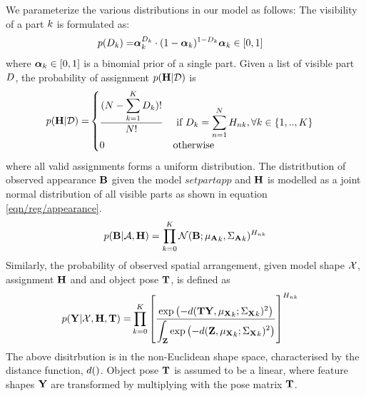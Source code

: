 We parameterize the various distributions in our model as follows:
The visibility of a part $k$ is formulated as:
\begin{align}
	p({D}_{k}) = & \bm{\alpha}_k^{{D}_{k}}\cdot(1-\bm{\alpha}_k)^{1-{D}_{k}} \bm{\alpha}_k\in[0, 1] 
	\label{eqn/reg/Ddist}
\end{align}
where $\bm{\alpha}_k\in [0, 1]$ is a binomial prior of a single part. Given a list of visible part ${D}$, the probability of assignment $p(\mathbf{H}|\mathcal{D})$ is 
\begin{align}
	p(\mathbf{H}|\mathcal{D}) = & 
	\begin{cases} 
	\displaystyle\frac{(N - \displaystyle\sum_{k=1}^{K}{D}_k)!}{N!} & \mbox{ if } {D}_k = \displaystyle\sum_{n=1}^{N}{H}_{nk},   \forall k\in\{1,..,K\} \\ 
	0 & \mbox{otherwise} 
	\end{cases}
	\label{eqn/reg/HDdist}
\end{align}
where all valid assignments forms a uniform distribution. The distritbution of observed appearance $\mathbf{B}$ given the model $setpartapp$ and $\mathbf{H}$ is modelled as a joint normal distribution of all visible parts as shown in equation \ref{eqn/reg/appearance}. 
\begin{equation}
	p(\mathbf{B}|\mathcal{A},\mathbf{H}) =\displaystyle\prod_{k=0}^K
	\mathcal{N}(\mathbf{B}; {\mu_{\mathbf{A}}}_k, {\Sigma_{\mathbf{A}}}_k)^{{H}_{nk}}
	\label{eqn/reg/appearance}
\end{equation}
Similarly, the probability of observed spatial arrangement, given model shape $\mathcal{X}$, assignment $\mathbf{H}$ and and object pose $\mathbf{T}$, is defined as 
\begin{align}
	\displaystyle p(\mathbf{Y}|\mathcal{X},\mathbf{H},\mathbf{T}) = & \prod_{k=0}^K
	\left[\frac{\textstyle\exp\left(-d(\mathbf{T}\mathbf{Y}, {\mu_{\mathbf{X}}}_k; {\Sigma_{\mathbf{X}}}_k)^2\right)}{\displaystyle\int_{\mathbf{Z}} \exp\left(-d(\mathbf{Z}, {\mu_{\mathbf{X}}}_k; {\Sigma_{\mathbf{X}}}_k)^2\right)}\right]^{{H}_{nk}}
	\label{eqn/reg/shape}
\end{align}
The above disitrbution is in the non-Euclidean shape space, characterised by the distance function, $d()$. Object pose $\mathbf{T}$ is assumed to be a linear, where feature shapes $\mathbf{Y}$ are transformed by multiplying with the pose matrix $\mathbf{T}$.   

